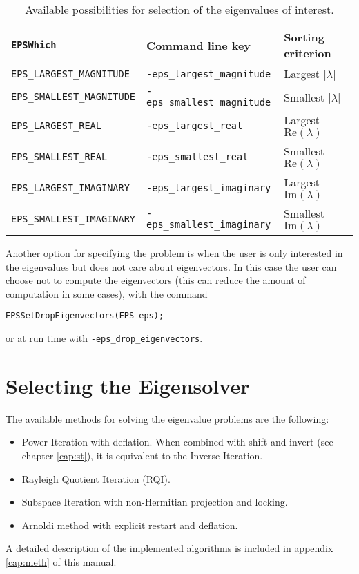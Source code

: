 \begin{table}[t]
\centering
{\small \begin{tabular}{lll}
\texttt{EPSWhich}                  & Command line key                   & Sorting criterion \\\hline
\texttt{EPS\_LARGEST\_MAGNITUDE}   & \texttt{-eps\_largest\_magnitude}  & Largest $|\lambda|$ \\
\texttt{EPS\_SMALLEST\_MAGNITUDE}  & \texttt{-eps\_smallest\_magnitude} & Smallest $|\lambda|$ \\
\texttt{EPS\_LARGEST\_REAL}        & \texttt{-eps\_largest\_real}       & Largest $\mathrm{Re}(\lambda)$ \\
\texttt{EPS\_SMALLEST\_REAL}       & \texttt{-eps\_smallest\_real}      & Smallest $\mathrm{Re}(\lambda)$ \\
\texttt{EPS\_LARGEST\_IMAGINARY}   & \texttt{-eps\_largest\_imaginary}  & Largest $\mathrm{Im}(\lambda)$ \footnotemark \\
\texttt{EPS\_SMALLEST\_IMAGINARY}  & \texttt{-eps\_smallest\_imaginary} & Smallest $\mathrm{Im}(\lambda)$ \addtocounter{footnote}{-1}\footnotemark \\
\end{tabular} }
\caption{\label{tab:portion}Available possibilities for selection of the eigenvalues of interest.}
\end{table}


	Another option for specifying the problem is when the user is only interested in the eigenvalues but does not care about eigenvectors. In this case the user can choose not to compute the eigenvectors (this can reduce the amount of computation in some cases), with the command
	\begin{Verbatim}[fontsize=\small]
	EPSSetDropEigenvectors(EPS eps);
	\end{Verbatim}
or at run time with \Verb!-eps_drop_eigenvectors!.

\section{Selecting the Eigensolver}

	The available methods for solving the eigenvalue problems are the following:
\begin{itemize}
\item Power Iteration with deflation. When combined with shift-and-invert (see chapter \ref{cap:st}), it is equivalent to the Inverse Iteration.
\item Rayleigh Quotient Iteration (RQI).
\item Subspace Iteration with non-Hermitian projection and locking.
\item Arnoldi method with explicit restart and deflation.
\end{itemize}
A detailed description of the implemented algorithms is included in appendix \ref{cap:meth} of this manual.


